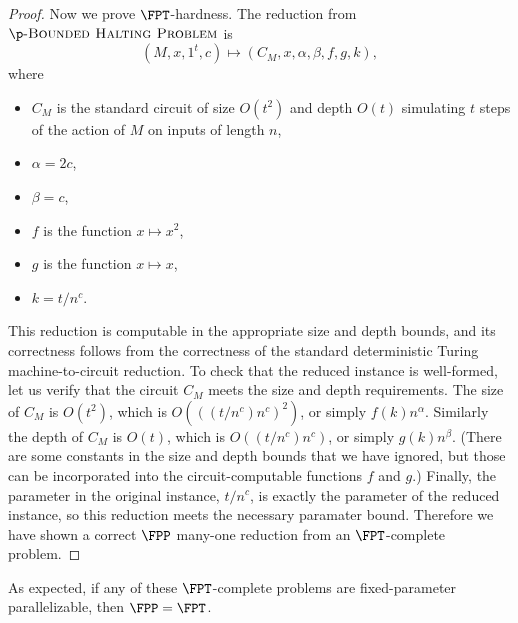 \documentclass{article}
\newcommand{\dash}{\textnormal{-}}
\begin{document}
\begin{proof}

  Now we prove $\FPT$-hardness.
  The reduction from $\p \dash \textsc{Bounded Halting Problem}$ is
  \[
  (M, x, 1^t, c) \mapsto (C_M, x, \alpha, \beta, f, g, k),
  \]
  where
  \begin{itemize}
  \item $C_M$ is the standard circuit of size $O(t^2)$ and depth $O(t)$ simulating $t$ steps of the action of $M$ on inputs of length $n$,
  \item $\alpha = 2c$,
  \item $\beta = c$,
  \item $f$ is the function $x \mapsto x^2$,
  \item $g$ is the function $x \mapsto x$,
  \item $k = t / n^c$.
  \end{itemize}
  This reduction is computable in the appropriate size and depth bounds, and its correctness follows from the correctness of the standard deterministic Turing machine-to-circuit reduction.
  To check that the reduced instance is well-formed, let us verify that the circuit $C_M$ meets the size and depth requirements.
  The size of $C_M$ is $O(t^2)$, which is $O(((t / n^c) n^c)^2)$, or simply $f(k) n^\alpha$.
  Similarly the depth of $C_M$ is $O(t)$, which is $O((t / n^c) n^c)$, or simply $g(k) n^\beta$.
  (There are some constants in the size and depth bounds that we have ignored, but those can be incorporated into the circuit-computable functions $f$ and $g$.)
  Finally, the parameter in the original instance, $t / n^c$, is exactly the parameter of the reduced instance, so this reduction meets the necessary paramater bound.
  Therefore we have shown a correct $\FPP$ many-one reduction from an $\FPT$-complete problem.
\end{proof}

As expected, if any of these $\FPT$-complete problems are fixed-parameter parallelizable, then $\FPP = \FPT$.
\end{document}
